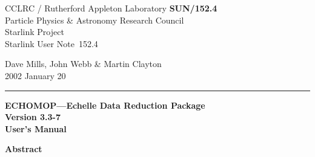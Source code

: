 \documentclass[11pt,twoside]{article}
\newcommand{\stardoccategory}  {Starlink User Note}
\newcommand{\stardocinitials}  {SUN}
\newcommand{\stardocnumber}    {152.4}
\newcommand{\stardocauthors}   {Dave Mills, John Webb \& Martin Clayton}
\newcommand{\stardocdate}      {2002 January 20}
\newcommand{\stardoctitle}     {ECHOMOP---Echelle Data Reduction Package}
\newcommand{\stardocversion}   {Version 3.3-7}	%
\newcommand{\stardocmanual}    {User's Manual}
\newcommand{\stardocname}{\stardocinitials /\stardocnumber}
\newenvironment{latexonly}{}{}
\begin{document}
\thispagestyle{empty}

\begin{latexonly}
   CCLRC / {\sc Rutherford Appleton Laboratory} \hfill {\bf \stardocname}\\
   {\large Particle Physics \& Astronomy Research Council}\\
   {\large Starlink Project\\}
   {\large \stardoccategory\ \stardocnumber}
   \begin{flushright}
   \stardocauthors\\
   \stardocdate
   \end{flushright}
   \vspace{-4mm}
   \rule{\textwidth}{0.5mm}
   \vspace{5mm}
   \begin{center}
   {\Huge\bf  \stardoctitle \\ [2.5ex]}
   {\LARGE\bf \stardocversion \\ [4ex]}
   {\Huge\bf  \stardocmanual}
   \end{center}
   \vspace{5mm}

   \vspace{10mm}
   \begin{center}
      {\Large\bf Abstract}
   \end{center}
\end{latexonly}
\end{document}
